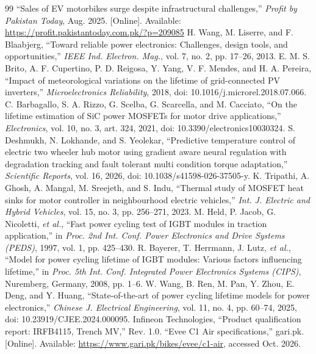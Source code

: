 \documentclass[conference]{IEEEtran}
\begin{document}
\begin{thebibliography}{99}
\footnotesize
{} ``Sales of EV motorbikes surge despite infrastructural challenges,'' \emph{Profit by Pakistan Today}, Aug. 2025. [Online]. Available: \url{https://profit.pakistantoday.com.pk/?p=209085}
 H. Wang, M. Liserre, and F. Blaabjerg, ``Toward reliable power electronics: Challenges, design tools, and opportunities,'' \emph{IEEE Ind. Electron. Mag.}, vol. 7, no. 2, pp. 17--26, 2013.
 E. M. S. Brito, A. F. Cupertino, P. D. Reigosa, Y. Yang, V. F. Mendes, and H. A. Pereira, ``Impact of meteorological variations on the lifetime of grid-connected PV inverters,'' \emph{Microelectronics Reliability}, 2018, doi: 10.1016/j.microrel.2018.07.066.
 C. Barbagallo, S. A. Rizzo, G. Scelba, G. Scarcella, and M. Cacciato, ``On the lifetime estimation of SiC power MOSFETs for motor drive applications,'' \emph{Electronics}, vol. 10, no. 3, art. 324, 2021, doi: 10.3390/electronics10030324.
 S. Deshmukh, N. Lokhande, and S. Yeolekar, ``Predictive temperature control of electric two wheeler hub motor using gradient aware neural regulation with degradation tracking and fault tolerant multi condition torque adaptation,'' \emph{Scientific Reports}, vol. 16, 2026, doi: 10.1038/s41598-026-37505-y.
 K. Tripathi, A. Ghosh, A. Mangal, M. Sreejeth, and S. Indu, ``Thermal study of MOSFET heat sinks for motor controller in neighbourhood electric vehicles,'' \emph{Int. J. Electric and Hybrid Vehicles}, vol. 15, no. 3, pp. 256--271, 2023.
 M. Held, P. Jacob, G. Nicoletti, \emph{et al.}, ``Fast power cycling test of IGBT modules in traction application,'' in \emph{Proc. 2nd Int. Conf. Power Electronics and Drive Systems (PEDS)}, 1997, vol. 1, pp. 425--430.
 R. Bayerer, T. Herrmann, J. Lutz, \emph{et al.}, ``Model for power cycling lifetime of IGBT modules: Various factors influencing lifetime,'' in \emph{Proc. 5th Int. Conf. Integrated Power Electronics Systems (CIPS)}, Nuremberg, Germany, 2008, pp. 1--6.
 W. Wang, B. Ren, M. Pan, Y. Zhou, E. Deng, and Y. Huang, ``State-of-the-art of power cycling lifetime models for power electronics,'' \emph{Chinese J. Electrical Engineering}, vol. 11, no. 4, pp. 60--74, 2025, doi: 10.23919/CJEE.2024.000095.
 Infineon Technologies, ``Product qualification report: IRFB4115, Trench MV,'' Rev. 1.0.
 ``Evee C1 Air specifications,'' gari.pk. [Online]. Available: \url{https://www.gari.pk/bikes/evee/c1-air}, accessed Oct. 2026.

\end{thebibliography}
\end{document}
